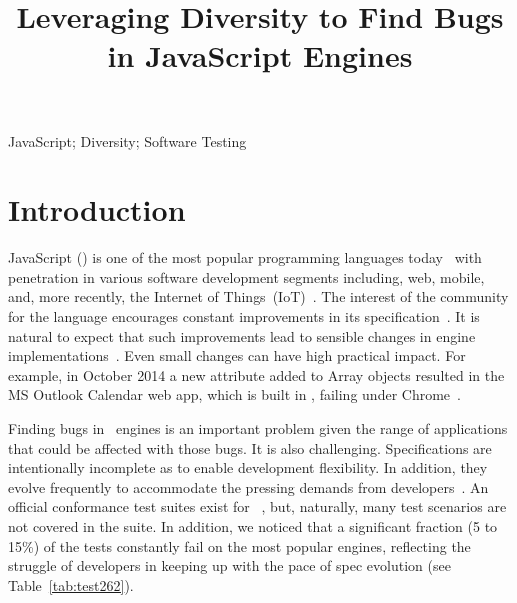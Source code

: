 \documentclass[10pt,conference,anonymous]{IEEEtran}
\begin{document}
\title{Leveraging Diversity to Find Bugs\\ in JavaScript Engines}


\maketitle

\thispagestyle{plain}
\pagestyle{plain}

\begin{abstract}
  
\end{abstract}

\begin{IEEEkeywords}
JavaScript; Diversity; Software Testing
\end{IEEEkeywords}

\section{Introduction}

JavaScript (\js{}) is one of the most popular programming languages
today~\cite{redmonk-javascript,stackify} with
penetration in various software development segments including, web, mobile,
and, more recently, the Internet of
Things~(IoT)~\cite{simply-technologies}. The interest of the community
for the language encourages constant improvements in its specification~\cite{ecmas262-spec}. It is natural to expect that such improvements
lead to sensible changes in engine implementations~\cite{kangax}. Even small
changes can have high practical impact. For example, in October 2014 a
new attribute added to Array objects resulted in the MS Outlook
Calendar web app, which is built in \js{}, failing under
Chrome~\cite{array-bug-chromium-issue4247,array-bug-discussion}.

Finding bugs in \js\ engines is an important problem given the range
of applications that could be affected with those bugs. It is also
challenging.  Specifications are intentionally incomplete as to enable
development flexibility. In addition, they evolve frequently to
accommodate the pressing demands from
developers~\cite{ecmas262-spec-repo}. An official conformance test
suites exist for \js~\cite{tc39-github}, but, naturally, many test
scenarios are not covered in the suite. In addition, we noticed that a
significant fraction (5 to 15\%) of the tests constantly fail on the
most popular engines, reflecting the struggle of developers in keeping
up with the pace of spec evolution (see Table~\ref{tab:test262}).
\end{document}
